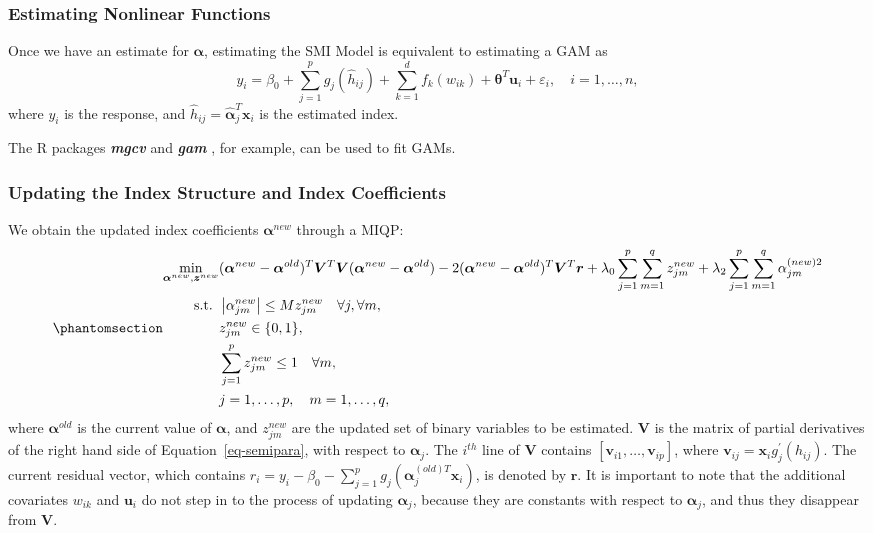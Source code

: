 \documentclass[
  11pt,
  a4paper,
]{article}
\begin{document}
\subsubsection{Estimating Nonlinear Functions}\label{sec-step2}

Once we have an estimate for \(\bm{\alpha}\), estimating the SMI Model
is equivalent to estimating a GAM as \[
  y_{i} = \beta_{0} + \sum_{j = 1}^{p}g_{j}(\hat{h}_{ij}) + \sum_{k = 1}^{d}f_{k}(w_{ik}) + \bm{\theta}^{T}\bm{u}_{i} + \varepsilon_{i}, \quad i = 1, \dots, n,
\] where \(y_{i}\) is the response, and
\(\hat{h}_{ij} = \hat{\bm{\alpha}}_{j}^{T}\bm{x}_{i}\) is the estimated
index.

The R packages \textbf{\emph{mgcv}} \autocite{Wood2011} and
\textbf{\emph{gam}} \autocite{Hastie2023}, for example, can be used to
fit GAMs.

\subsubsection{Updating the Index Structure and Index
Coefficients}\label{sec-step3}

We obtain the updated index coefficients \(\bm{\alpha}^{new}\) through a
MIQP: \begin{equation}\phantomsection\label{eq-smi-update}{
\begin{aligned}
  \min_{\bm{\alpha}^{new}, \bm{z}^{new}} & (\bm{\alpha}^{new} - \bm{\alpha}^{old})^{T}\bm{V}^{T}\bm{V}(\bm{\alpha}^{new} - \bm{\alpha}^{old}) - 2(\bm{\alpha}^{new} - \bm{\alpha}^{old})^{T}\bm{V}^{T}\bm{r} + \lambda_{0}\sum_{j = 1}^{p}\sum_{m = 1}^{q}z_{jm}^{new} + \lambda_{2}\sum_{j = 1}^{p}\sum_{m = 1}^{q}\alpha_{jm}^{(new)2} \\
  \text{s.t. } & \left |\alpha_{jm}^{new}\right | \le Mz_{jm}^{new} \quad \forall j, \forall m,\\
  & z_{jm}^{new} \in \{0, 1\}, \\
  & \sum_{j = 1}^{p}z_{jm}^{new} \le 1 \quad \forall m, \\
  & j = 1, \dots, p, \quad m = 1, \dots, q,
\end{aligned}
}\end{equation} where \(\bm{\alpha}^{old}\) is the current value of
\(\bm{\alpha}\), and \(z_{jm}^{new}\) are the updated set of binary
variables to be estimated. \(\bm{V}\) is the matrix of partial
derivatives of the right hand side of Equation~\ref{eq-semipara}, with
respect to \(\bm{\alpha}_{j}\). The \(i^{th}\) line of \(\bm{V}\)
contains \(\left [ \bm{v}_{i1}, \dots, \bm{v}_{ip} \right ]\), where
\(\bm{v}_{ij} = \bm{x}_{i}g_{j}^{'}(h_{ij})\). The current residual
vector, which contains
\(r_{i} = y_{i} - \beta_{0} - \sum_{j = 1}^{p}g_{j}(\bm{\alpha}_{j}^{(old)T}\bm{x}_{i})\),
is denoted by \(\bm{r}\). It is important to note that the additional
covariates \(w_{ik}\) and \(\bm{u}_{i}\) do not step in to the process
of updating \(\bm{\alpha}_{j}\), because they are constants with respect
to \(\bm{\alpha}_{j}\), and thus they disappear from \(\bm{V}\).
\end{document}
